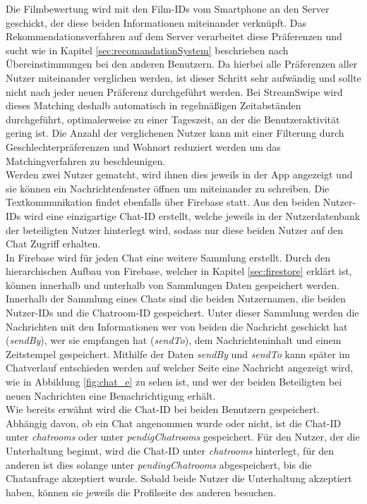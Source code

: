 Die Filmbewertung wird mit den Film-IDs vom Smartphone an den Server geschickt, der diese beiden Informationen miteinander verknüpft. Das Rekommendationsverfahren auf dem Server verarbeitet diese Präferenzen und sucht wie in Kapitel \ref{sec:recomandationSystem} beschrieben nach Übereinstimmungen bei den anderen Benutzern. Da hierbei alle Präferenzen aller Nutzer miteinander verglichen werden, ist dieser Schritt sehr aufwändig und sollte nicht nach jeder neuen Präferenz durchgeführt werden. Bei StreamSwipe wird dieses Matching deshalb automatisch in regelmäßigen Zeitabständen durchgeführt, optimalerweise zu einer Tageszeit, an der die Benutzeraktivität gering ist. Die Anzahl der verglichenen Nutzer kann mit einer Filterung durch Geschlechterpräferenzen und Wohnort reduziert werden um das Matchingverfahren zu beschleunigen. \\
Werden zwei Nutzer gematcht, wird ihnen dies jeweils in der App angezeigt und sie können ein Nachrichtenfenster öffnen um miteinander zu schreiben. Die Textkommunikation findet ebenfalls über  Firebase statt. Aus den beiden Nutzer-IDs wird eine einzigartige Chat-ID erstellt, welche jeweils in der Nutzerdatenbank der beteiligten Nutzer hinterlegt wird, sodass nur diese beiden Nutzer auf den Chat Zugriff erhalten.\\
In Firebase wird für jeden Chat eine weitere Sammlung erstellt. Durch den hierarchischen Aufbau von Firebase, welcher in Kapitel \ref{sec:firestore} erklärt ist, können innerhalb und unterhalb von Sammlungen Daten gespeichert werden. Innerhalb der Sammlung eines Chats sind die beiden Nutzernamen, die beiden Nutzer-IDs und die Chatroom-ID gespeichert. Unter dieser Sammlung werden die Nachrichten mit den Informationen wer von beiden die Nachricht geschickt hat (\textit{sendBy}), wer sie empfangen hat (\textit{sendTo}), dem Nachrichteninhalt und einem Zeitstempel gespeichert. Mithilfe der Daten \textit{sendBy} und \textit{sendTo} kann später im Chatverlauf entschieden werden auf welcher Seite eine Nachricht angezeigt wird, wie in Abbildung \ref{fig:chat_e} zu sehen ist, und wer der beiden Beteiligten bei neuen Nachrichten eine Benachrichtigung erhält.\\
Wie bereits erwähnt wird die Chat-ID bei beiden Benutzern gespeichert. Abhängig davon, ob ein Chat angenommen wurde oder nicht, ist die Chat-ID unter \textit{chatrooms} oder unter \textit{pendigChatrooms} gespeichert. Für den Nutzer, der die Unterhaltung beginnt, wird die Chat-ID unter \textit{chatrooms} hinterlegt, für den anderen ist dies solange unter \textit{pendingChatrooms} abgespeichert, bis die Chatanfrage akzeptiert wurde. Sobald beide Nutzer die Unterhaltung akzeptiert haben, können sie jeweils die Profilseite des anderen besuchen.


